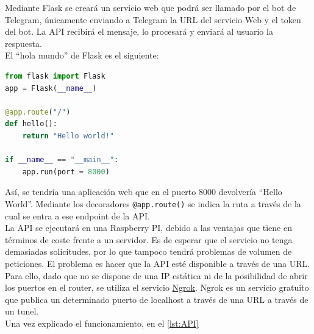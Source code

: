 Mediante Flask se creará un servicio web que podrá ser llamado por el bot de Telegram, únicamente enviando a Telegram la URL del servicio Web y el token del bot. La API recibirá el mensaje, lo procesará y enviará al usuario la respuesta.\\

El ``hola mundo'' de Flask es el siguiente:

\begin{lstlisting}[language=Python, caption= {Aplicación Web básica creada con Flask. Se crea una API que devolverá la cadena de texto \textit{Hello world!} al ser invocada. Fuente: Wikipedia}]
from flask import Flask
app = Flask(__name__)

@app.route("/")
def hello():
    return "Hello world!"

if __name__ == "__main__":
    app.run(port = 8000)
\end{lstlisting}

Así, se tendría una aplicación web que en el puerto $8000$ devolvería ``Hello World''. Mediante los decoradores \texttt{@app.route()} se indica la ruta a través de la cual se entra a ese endpoint de la API.\\

La API se ejecutará en una Raspberry PI, debido a las ventajas que tiene en términos de coste frente a un servidor. Es de esperar que el servicio no tenga demasiadas solicitudes, por lo que tampoco tendrá problemas de volumen de peticiones. El problema es hacer que la API esté disponible a través de una URL. Para ello, dado que no se dispone de una IP estática ni de la posibilidad de abrir los puertos en el router, se utiliza el servicio \href{https://ngrok.com/}{Ngrok}. Ngrok es un servicio gratuito que publica un determinado puerto de localhost a través de una URL a través de un tunel.\\

Una vez explicado el funcionamiento, en el \autoref{lst:API}

